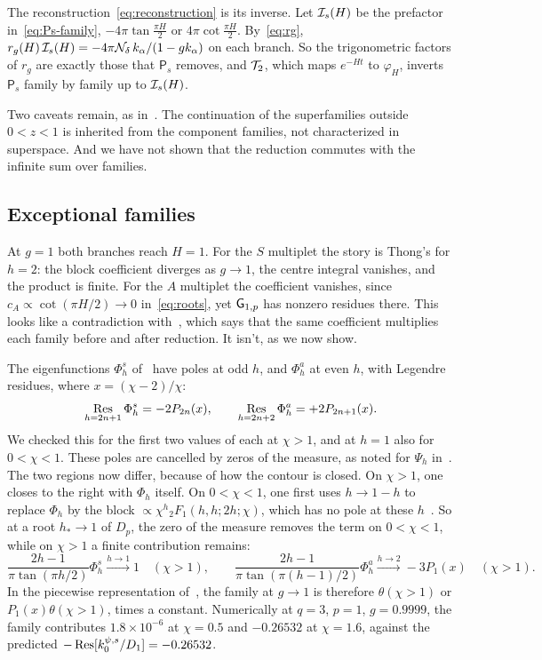 The reconstruction~\eqref{eq:reconstruction} is its inverse. Let $\mathcal{I}_s(H)$ be the prefactor in~\eqref{eq:Ps-family}, $-4\pi\tan\frac{\pi H}2$ or $4\pi\cot\frac{\pi H}2$. By~\eqref{eq:rg}, $r_g(H)\,\mathcal{I}_s(H)=-4\pi\mathcal{N}_\delta\,k_\alpha/(1-gk_\alpha)$ on each branch. So the trigonometric factors of $r_g$ are exactly those that $\mathsf P_s$ removes, and $\mathcal{T}_2$, which maps $e^{-Ht}$ to $\varphi_H$, inverts $\mathsf P_s$ family by family up to $\mathcal{I}_s(H)$.

Two caveats remain, as in~\cite{Thong:2026}. The continuation of the superfamilies outside $0<z<1$ is inherited from the component families, not characterized in superspace. And we have not shown that the reduction commutes with the infinite sum over families.

\subsection{Exceptional families}
\label{subsec:exceptional}

At $g=1$ both branches reach $H=1$. For the $S$ multiplet the story is Thong's for $h=2$: the block coefficient diverges as $g\to1$, the centre integral vanishes, and the product is finite. For the $A$ multiplet the coefficient vanishes, since $c_A\propto\cot(\pi H/2)\to0$ in~\eqref{eq:roots}, yet $\mathsf{G}_{1,p}$ has nonzero residues there. This looks like a contradiction with~\cite[(3.13)]{Thong:2026}, which says that the same coefficient multiplies each family before and after reduction. It isn't, as we now show.

The eigenfunctions $\Phi^s_h$ of~\cite{Peng:2017spg} have poles at odd $h$, and $\Phi^a_h$ at even $h$, with Legendre residues, where $x=(\chi-2)/\chi$:
\begin{equation}\label{eq:Phi-res}
\operatorname*{Res}_{h=2n+1}\Phi^s_h=-2P_{2n}(x),\qquad\operatorname*{Res}_{h=2n+2}\Phi^a_h=+2P_{2n+1}(x).
\end{equation}
We checked this for the first two values of each at $\chi>1$, and at $h=1$ also for $0<\chi<1$. These poles are cancelled by zeros of the measure, as noted for $\Psi_h$ in~\cite{Maldacena:2016hyu}. The two regions now differ, because of how the contour is closed. On $\chi>1$, one closes to the right with $\Phi_h$ itself. On $0<\chi<1$, one first uses $h\to1-h$ to replace $\Phi_h$ by the block $\propto\chi^h{}_2F_1(h,h;2h;\chi)$, which has no pole at these $h$~\cite{Maldacena:2016hyu,Peng:2017spg}. So at a root $h_*\to1$ of $D_p$, the zero of the measure removes the term on $0<\chi<1$, while on $\chi>1$ a finite contribution remains:
\begin{equation}\label{eq:step}
\frac{2h-1}{\pi\tan(\pi h/2)}\Phi^s_h\xrightarrow{h\to1}1\quad(\chi>1),\qquad\frac{2h-1}{\pi\tan(\pi(h-1)/2)}\Phi^a_h\xrightarrow{h\to2}-3P_1(x)\quad(\chi>1).
\end{equation}
In the piecewise representation of~\cite[(C.4)]{Thong:2026}, the family at $g\to1$ is therefore $\theta(\chi>1)$ or $P_1(x)\theta(\chi>1)$, times a constant. Numerically at $q=3$, $p=1$, $g=0.9999$, the family contributes $1.8\times10^{-6}$ at $\chi=0.5$ and $-0.26532$ at $\chi=1.6$, against the predicted $-\operatorname*{Res}[k_0^{\psi,s}/D_1]=-0.26532$.

